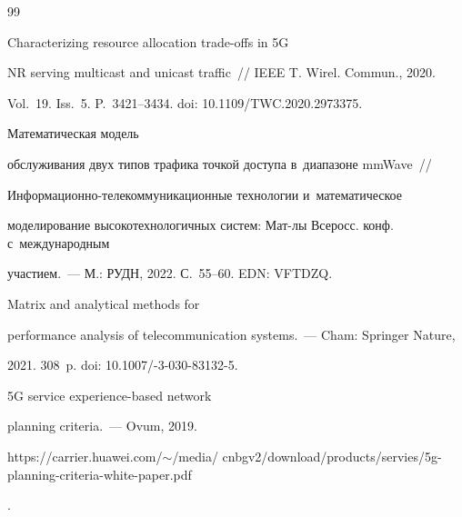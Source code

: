 {{\begin{thebibliography}{99}

 Characterizing resource allocation trade-offs in 5G 

NR serving multicast and unicast traffic~/\!\!/ IEEE T. Wirel. Commun., 2020. 

Vol.~19. Iss.~5. P.~3421--3434. doi: 10.1109\!/\!TWC.2020.2973375.




 Математическая модель 

обслуживания двух типов трафика точ\-кой до\-сту\-па в~диапазоне mmWave~/\!\!/  

Ин\-фор\-ма\-ци\-он\-но-те\-ле\-ком\-му\-ни\-ка\-ци\-он\-ные технологии и~математическое 

моделирование высокотехнологичных систем: Мат-лы Всеросс. конф. с~международным 

участием.~--- М.: РУДН, 2022. С.~55--60. EDN: VFTDZQ.







 Matrix and analytical methods for 

performance analysis of telecommunication systems.~--- Cham: Springer Nature, 

2021. 308~p. doi: 10.1007\!/-3-030-83132-5.




 5G service experience-based network 

planning criteria.~--- Ovum, 2019.  {\sf 

https://carrier.huawei.com/$\sim$/media/ cnbgv2/download/products/servies/5g-planning-criteria-white-paper.pdf}.





     \end{thebibliography}

} }







